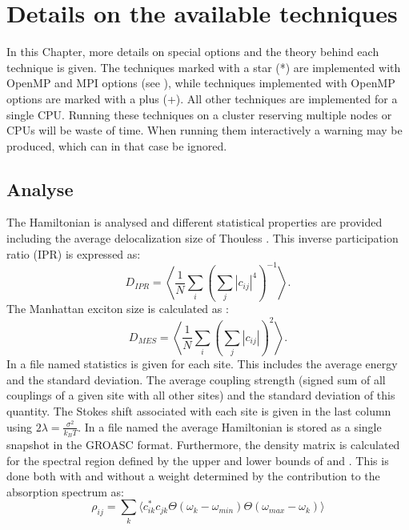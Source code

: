 \chapter{\label{chap:techniques}Details on the available techniques}
In this Chapter, more details on special options and the theory behind each technique
is given. The techniques marked with a star (*) are implemented with OpenMP and MPI 
options (see \cite{Sardjan_2020}), while techniques implemented with OpenMP options
are marked with a plus (+). All other techniques are implemented for a single CPU.
Running these techniques on a cluster reserving multiple nodes or CPUs will be waste
of time. When running them interactively a warning may be produced, which can in that
case be ignored.

\section{Analyse}
The Hamiltonian is analysed and different statistical properties are provided
including the average delocalization size of Thouless \cite{Thouless.1974.PR.13.93}.
This inverse participation ratio (IPR) is expressed as:
\begin{equation}
	D_{IPR}=\left\langle\frac{1}{N}\sum_i\left(\sum_j |c_{ij}|^{4}\right)^{-1}\right\rangle.
\end{equation}
The Manhattan exciton size is calculated as \cite{Jansen.2025.J.Chem.Phys..162.074113}:
\begin{equation}
	D_{MES}=\left\langle\frac{1}{N}\sum_i\left(\sum_j |c_{ij}|\right)^{2}\right\rangle.
\end{equation}
In a file named  statistics is given for each site.
This includes the average energy and the standard deviation. The average coupling
strength (signed sum of all couplings of a given site with all other sites) and the
standard deviation of this quantity. The Stokes shift associated with each site is
given in the last column using $2\lambda=\frac{\sigma^2}{k_BT}$. In a file named
 the average Hamiltonian is stored as a single snapshot in
the GROASC format. Furthermore, the density matrix is calculated for the spectral
region defined by the upper and lower bounds of  and
. This is done both with and without a weight determined by the
contribution to the absorption spectrum as:
\begin{equation}
\rho_{ij}=\sum_k \Big\langle c_{ik}^* c_{jk}  \Theta(\omega_{k}-\omega_{min})\Theta(\omega_{max}-\omega_k)\Big\rangle
\end{equation}
